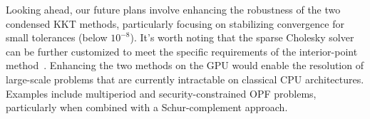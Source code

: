 \documentclass[smallextended]{svjour3}
\begin{document}
Looking ahead, our future plans involve enhancing the robustness of the two condensed KKT methods, particularly focusing on stabilizing convergence for small tolerances (below $10^{-8}$).
It's worth noting that the sparse Cholesky solver can be further customized to meet the specific requirements of the interior-point method~\cite{wright1999modified}.
Enhancing the two methods on the GPU would enable the resolution of large-scale problems that are currently intractable on classical CPU architectures.
Examples include multiperiod and security-constrained OPF problems, particularly when combined with a Schur-complement approach.

\small


\normalsize
\end{document}
